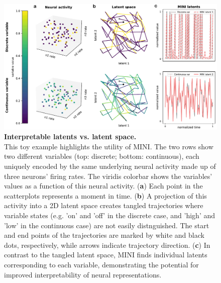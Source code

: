 \begin{figure}[h]
    \centering
    \includegraphics[width=\linewidth]{figures/interpretable_latents_vs_latent_space.pdf}
    \caption{
        \textbf{Interpretable latents vs. latent space.} \\
        \small This toy example highlights the utility of MINI. The two rows show two different variables (top: discrete; bottom: continuous), each uniquely encoded by the same underlying neural activity made up of three neurons' firing rates. The viridis colorbar shows the variables' values as a function of this neural activity. (\textbf{a}) Each point in the scatterplots represents a moment in time. (\textbf{b}) A projection of this activity into a 2D latent space creates tangled trajectories where variable states (e.g. 'on' and 'off' in the discrete case, and 'high' and 'low' in the continuous case) are not easily distnguished. The start and end points of the trajectories are marked by white and black dots, respectively, while arrows indicate trajectory direction. (\textbf{c}) In contrast to the tangled latent space, MINI finds individual latents corresponding to each variable, demonstrating the potential for improved interpretability of neural representations.
    }
    \label{figure:interpretable_latents_vs_latent_space}
\end{figure}